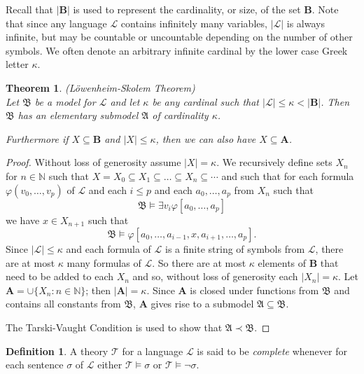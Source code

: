 \documentclass[titlepage, oneside]{amsbook}
\theoremstyle{plain}
\newtheorem{theorem}{Theorem}
\theoremstyle{definition}
\newtheorem{definition}{Definition}
\theoremstyle{remark}
\newcommand{\lan}{\ensuremath{\mathcal{L}}}
\newcommand{\bb}{\ensuremath{\mathbf{B}}}
\begin{document}
Recall that $|\bb|$ is used to represent the cardinality, or size, of
the set $\bb$.  Note that since any language $\lan$ contains
infinitely many variables, $|\lan|$ is always infinite, but may be
countable or uncountable depending on the number of other symbols.
We often denote an arbitrary infinite cardinal by the lower case Greek
letter $\kappa$.

\begin{theorem} (L\"{o}wenheim-Skolem Theorem) \\
%
Let $\mathfrak{B}$ be a model for $\mathcal{L}$ and let $\kappa$ be any 
cardinal such that $\left| \mathcal{L} \right| \leq \kappa < \left|
\bb \right|$. 
Then $\mathfrak{B}$ has an elementary submodel $\mathfrak{A}$ of 
cardinality $\kappa$.

Furthermore if $ X \subseteq \mathbf{B} $ and $ |X | \leq \kappa$, then 
we can also have $ X \subseteq \mathbf{A}$. 

\end{theorem}

\begin{proof} Without loss of generosity assume $|X| = \kappa$.
We recursively define sets $X_{n}$ for $n \in \mathbb{N}$ such that $ X =
X_{0} \subseteq X_{1} \subseteq \dots \subseteq X_{n} \subseteq \cdots $ 
and such that for each formula $\varphi (v_{0} , \dots , v_{p})$ of 
$\mathcal{L}$ and each $i \leq p$ and each $a_{0}, \dots , a_{p}$ from $X_{n}
$ such that \[ \mathfrak{B} \models \exists v_{i} \varphi [a_{0} ,
\dots 
, a_{p}] \] we have  $x \in X_{n+1}$  such that 
\[ \mathfrak{B} 
\models \varphi [ a_{0}, \dots , a_{i-1} , x , a_{i+1} , \dots , a_{p} ] 
.\]
Since $| \mathcal{L} | \leq \kappa $ and each formula of $\lan$ is a
finite string of symbols from $\lan$, there are at most $\kappa$ many
formulas of $\lan$.  So there are at most $\kappa$ elements of $\bb$ that
need to be added to each $X_n$ and so,  without loss of generosity
each $|X_{n} | = \kappa $. Let $\mathbf{A} =  \cup \{ X_{n}: n \in
\mathbb{N} \}$; then $| \mathbf{A}| = \kappa $.
 Since $\mathbf{A}$ is closed under functions from 
$\mathfrak{B}$ and  contains all constants from $\mathfrak{B}$, 
$\mathbf{A}$ gives rise to a submodel $\mathfrak{A} \subseteq \mathfrak{B}$.

The Tarski-Vaught Condition is used to show that $\mathfrak{A} \prec 
\mathfrak{B}$.
\end{proof}

\begin{definition}
%
A theory $\mathcal{T}$ for a language $\mathcal{L}$ is said to be 
\emph{complete} whenever for each sentence $\sigma$ of $\mathcal{L}$ 
either $\mathcal{T} \models \sigma \mbox{ or } \mathcal{T} \models \neg 
\sigma$.
\end{definition}
\end{document}

